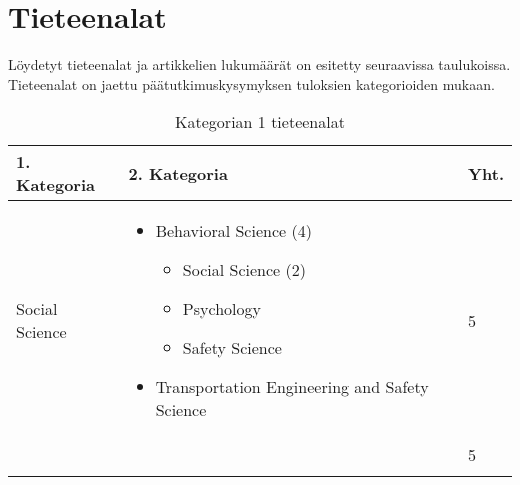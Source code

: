 \documentclass[utf8]{gradu3}
\begin{document}
\section{Tieteenalat} \label{tieteenalat}
Löydetyt tieteenalat ja artikkelien lukumäärät on esitetty seuraavissa taulukoissa.
Tieteenalat on jaettu päätutkimuskysymyksen tuloksien kategorioiden mukaan.

\begin{longtable}[h]{|p{5cm}|p{8cm}|p{1cm}|}
    \hline
    \textbf{1. Kategoria}    & \textbf{2. Kategoria} & \textbf{Yht.} \\
    \hline
    Social Science  &  
    \begin{itemize}[nosep]
        \item Behavioral Science (4) 
        \begin{itemize}[nosep]
            \item Social Science (2)
            \item Psychology 
            \item Safety Science
        \end{itemize}
        \item Transportation Engineering and Safety Science 
    \end{itemize}  
    & 5 \\
    \hline
            &   & 5 \\
    \hline
    \caption{Kategorian 1 tieteenalat}
    \label{table:tieteenalat1}
\end{longtable}
\end{document}

